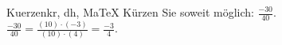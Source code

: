 \begin{MAufgabe}{Kuerzen}{kr, dh, MaTeX}
K\"urzen Sie soweit m\"oglich: $\frac{-30}{40}$.\\ 
\ifLsg\MLoesung
\quad $\frac{-30}{40}=\frac{(10)\cdot(-3)}{(10)\cdot(4)}=\frac{-3}{4}$.\else\relax\fi
 \end{MAufgabe}